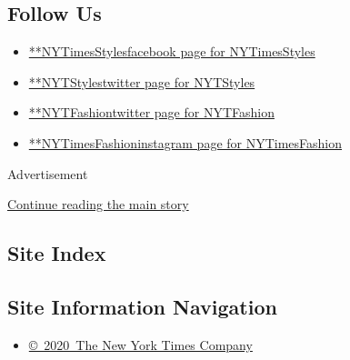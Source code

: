 \hypertarget{follow-us}{%
\subsection{Follow Us}\label{follow-us}}

\begin{itemize}
\tightlist
\item
  \href{https://www.facebookcorewwwi.onion/NYTimesStyles}{**NYTimesStylesfacebook
  page for NYTimesStyles}
\item
  \href{https://twitter.com/NYTStyles}{**NYTStylestwitter page for
  NYTStyles}
\item
  \href{https://twitter.com/NYTFashion}{**NYTFashiontwitter page for
  NYTFashion}
\item
  \href{https://instagram.com/NYTimesFashion}{**NYTimesFashioninstagram
  page for NYTimesFashion}
\end{itemize}

Advertisement

\protect\hyperlink{after-mktg}{Continue reading the main story}

\hypertarget{site-index}{%
\subsection{Site Index}\label{site-index}}

\hypertarget{site-information-navigation}{%
\subsection{Site Information
Navigation}\label{site-information-navigation}}

\begin{itemize}
\tightlist
\item
  \href{https://help.nytimes3xbfgragh.onion/hc/en-us/articles/115014792127-Copyright-notice}{©~2020~The
  New York Times Company}
\end{itemize}


